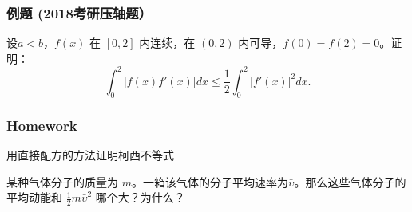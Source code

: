 \documentclass[CJK,13pt]{beamer}
\begin{document}
  \begin{frame}
    \frametitle{例题 (2018考研压轴题）}
    设$a<b$，$f(x)$ 在 $[0,2]$ 内连续，在 $(0,2)$ 内可导，$f(0)=f(2)=0$。证明：
    $$ \int_0^2 |f(x)f'(x)| dx \le \frac{1}{2}\int_0^2 |f'(x)|^2 dx.$$   
  \end{frame}
  
  
  
  \begin{frame}
    \frametitle{Homework}
    \bitem
  \item{用直接配方的方法证明柯西不等式}
  \item{某种气体分子的质量为 $m$。一箱该气体的分子平均速率为$\bar{\upsilon}$。那么这些气体分子的平均动能和 $\frac{1}{2}m\bar{\upsilon}^2$ 哪个大？为什么？}
    \eitem
  \end{frame}
\ech
\end{document}

